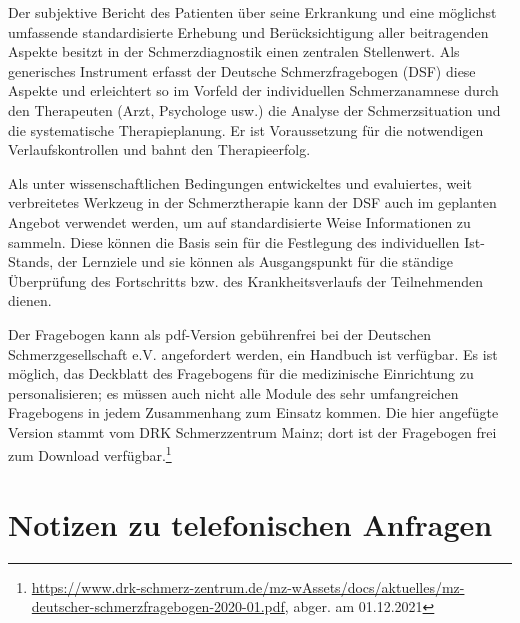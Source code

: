 \documentclass[
  twoside,
  parskip=half-,
]{scrreprt}
\begin{document}
\begin{displayquote}
Der subjektive Bericht des Patienten über seine Erkrankung und eine möglichst umfassende standardisierte Erhebung und Berücksichtigung aller beitragenden Aspekte besitzt in der Schmerzdiagnostik einen zentralen Stellenwert.
Als generisches Instrument erfasst der Deutsche Schmerzfragebogen (DSF) diese Aspekte und erleichtert so im Vorfeld der individuellen Schmerzanamnese durch den Therapeuten (Arzt, Psychologe usw.) die Analyse der Schmerzsituation und die systematische Therapieplanung. Er ist Voraussetzung für die notwendigen Verlaufskontrollen und bahnt den Therapieerfolg.
\end{displayquote}

Als unter wissenschaftlichen Bedingungen entwickeltes und evaluiertes, weit verbreitetes Werkzeug in der Schmerztherapie kann der DSF auch im geplanten Angebot verwendet werden, um auf standardisierte Weise Informationen zu sammeln. Diese können die Basis sein für die Festlegung des individuellen Ist-Stands, der Lernziele und sie können als Ausgangspunkt für die ständige Überprüfung des Fortschritts bzw. des Krankheitsverlaufs der Teilnehmenden dienen.

Der Fragebogen kann als pdf-Version gebührenfrei bei der Deutschen Schmerzgesellschaft e.V. angefordert werden, ein Handbuch ist verfügbar. Es ist möglich, das Deckblatt des Fragebogens für die medizinische Einrichtung zu personalisieren; es müssen auch nicht alle Module des sehr umfangreichen Fragebogens in jedem Zusammenhang zum Einsatz kommen. Die hier angefügte Version stammt vom DRK Schmerzzentrum Mainz; dort ist der Fragebogen frei zum Download verfügbar.\footnote{\url{https://www.drk-schmerz-zentrum.de/mz-wAssets/docs/aktuelles/mz-deutscher-schmerzfragebogen-2020-01.pdf}, abger. am 01.12.2021}



\chapter{Notizen zu telefonischen Anfragen}
\end{document}
